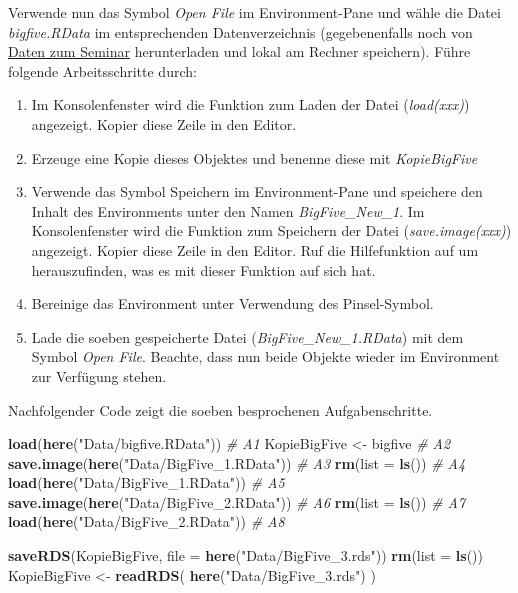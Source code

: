 \documentclass[]{article}
\newenvironment{Shaded}{\begin{snugshade}}{\end{snugshade}}
\newcommand{\KeywordTok}[1]{\textcolor[rgb]{0.13,0.29,0.53}{\textbf{#1}}}
\newcommand{\DataTypeTok}[1]{\textcolor[rgb]{0.13,0.29,0.53}{#1}}
\newcommand{\StringTok}[1]{\textcolor[rgb]{0.31,0.60,0.02}{#1}}
\newcommand{\CommentTok}[1]{\textcolor[rgb]{0.56,0.35,0.01}{\textit{#1}}}
\newcommand{\NormalTok}[1]{#1}
\providecommand{\tightlist}{%
  \setlength{\itemsep}{0pt}\setlength{\parskip}{0pt}}
\begin{document}
Verwende nun das Symbol \emph{Open File} im Environment-Pane und wähle
die Datei \emph{bigfive.RData} im entsprechenden Datenverzeichnis
(gegebenenfalls noch von
\href{http://tuval.at/lehrveranstaltungen/daten/data}{Daten zum Seminar}
herunterladen und lokal am Rechner speichern). Führe folgende
Arbeitsschritte durch:

\begin{enumerate}
\def\labelenumi{\arabic{enumi}.}
\tightlist
\item
  Im Konsolenfenster wird die Funktion zum Laden der Datei
  (\emph{load(xxx)}) angezeigt. Kopier diese Zeile in den Editor.
\item
  Erzeuge eine Kopie dieses Objektes und benenne diese mit
  \emph{KopieBigFive}
\item
  Verwende das Symbol Speichern im Environment-Pane und speichere den
  Inhalt des Environments unter den Namen \emph{BigFive\_New\_1}. Im
  Konsolenfenster wird die Funktion zum Speichern der Datei
  (\emph{save.image(xxx)}) angezeigt. Kopier diese Zeile in den Editor.
  Ruf die Hilfefunktion auf um herauszufinden, was es mit dieser
  Funktion auf sich hat.
\item
  Bereinige das Environment unter Verwendung des Pinsel-Symbol.
\item
  Lade die soeben gespeicherte Datei (\emph{BigFive\_New\_1.RData}) mit
  dem Symbol \emph{Open File}. Beachte, dass nun beide Objekte wieder im
  Environment zur Verfügung stehen.
\end{enumerate}

Nachfolgender Code zeigt die soeben besprochenen Aufgabenschritte.

\begin{Shaded}
\begin{Highlighting}[]
  \KeywordTok{load}\NormalTok{(}\KeywordTok{here}\NormalTok{(}\StringTok{"Data/bigfive.RData"}\NormalTok{)) }\CommentTok{# A1}
\NormalTok{  KopieBigFive <-}\StringTok{ }\NormalTok{bigfive  }\CommentTok{# A2}
  \KeywordTok{save.image}\NormalTok{(}\KeywordTok{here}\NormalTok{(}\StringTok{"Data/BigFive_1.RData"}\NormalTok{))  }\CommentTok{# A3}
  \KeywordTok{rm}\NormalTok{(}\DataTypeTok{list =} \KeywordTok{ls}\NormalTok{()) }\CommentTok{# A4}
  \KeywordTok{load}\NormalTok{(}\KeywordTok{here}\NormalTok{(}\StringTok{"Data/BigFive_1.RData"}\NormalTok{)) }\CommentTok{# A5}
  \KeywordTok{save.image}\NormalTok{(}\KeywordTok{here}\NormalTok{(}\StringTok{"Data/BigFive_2.RData"}\NormalTok{)) }\CommentTok{# A6}
  \KeywordTok{rm}\NormalTok{(}\DataTypeTok{list =} \KeywordTok{ls}\NormalTok{()) }\CommentTok{# A7}
  \KeywordTok{load}\NormalTok{(}\KeywordTok{here}\NormalTok{(}\StringTok{"Data/BigFive_2.RData"}\NormalTok{)) }\CommentTok{# A8}
  
  \KeywordTok{saveRDS}\NormalTok{(KopieBigFive, }\DataTypeTok{file =} \KeywordTok{here}\NormalTok{(}\StringTok{"Data/BigFive_3.rds"}\NormalTok{))}
  \KeywordTok{rm}\NormalTok{(}\DataTypeTok{list =} \KeywordTok{ls}\NormalTok{())}
\NormalTok{  KopieBigFive <-}\StringTok{ }\KeywordTok{readRDS}\NormalTok{( }\KeywordTok{here}\NormalTok{(}\StringTok{"Data/BigFive_3.rds"}\NormalTok{) )}
\end{Highlighting}
\end{Shaded}
\end{document}
